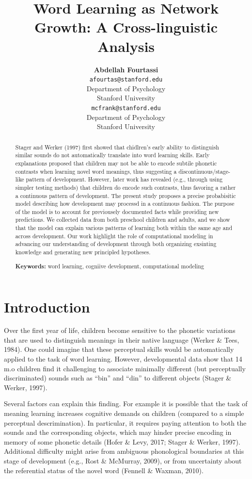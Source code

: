\documentclass[10pt, letterpaper]{article}
\title{Word Learning as Network Growth: A Cross-linguistic Analysis}
\author{{\large \bf Abdellah Fourtassi} \\ \texttt{afourtas@stanford.edu} \\ Department of Psychology \\ Stanford University \And {\large \bf Michael C. Frank} \\ \texttt{mcfrank@stanford.edu} \\ Department of Psychology \\ Stanford University}
\begin{document}
\maketitle

\begin{abstract}
Stager and Werker (1997) first showed that chidlren's early ability to
distinguish similar sounds do not automatically translate into word
learning skills. Early explanations proposed that children may not be
able to encode subtile phonetic contrasts when learning novel word
meanings, thus suggesting a discontinuous/stage-like pattern of
development. However, later work has revealed (e.g., through using
simpler testing methods) that children do encode such contrasts, thus
favoring a rather a continuous pattern of development. The present study
proposes a precise probabisitic model describing how development may
processd in a continuous fashion. The purpose of the model is to account
for previousely documented facts while providing new predictions. We
collected data from both preschool children and adults, and we show that
the model can explain various patterns of learning both within the same
age and across development. Our work highlight the role of computational
modeling in advancing our understanding of development through both
organizing exsinting knowledge and generating new principled hypotheses.

\textbf{Keywords:}
word learning, cogniive development, computational modeling
\end{abstract}

\section{Introduction}\label{introduction}

Over the first year of life, children become sensitive to the phonetic
variations that are used to distinguish meanings in their native
language (Werker \& Tees, 1984). One could imagine that these perceptual
skills would be automatically applied to the task of word learning.
However, developmental data show that 14 m.o children find it
challenging to associate minimally different (but perceptually
discriminated) sounds such as ``bin'' and ``din'' to different objects
(Stager \& Werker, 1997).

Several factors can explain this finding. For example it is possible
that the task of meaning learning increases cognitive demands on
children (compared to a simple perceptual descrimination). In
particular, it requires paying attention to both the sounds and the
corresponding objects, which may hinder precise encoding in memory of
some phonetic details (Hofer \& Levy, 2017; Stager \& Werker, 1997).
Additional difficulty might arise from ambiguous phonological boundaries
at this stage of development (e.g., Rost \& McMurray, 2009), or from
uncertainty about the referential status of the novel word (Fennell \&
Waxman, 2010).
\end{document}
